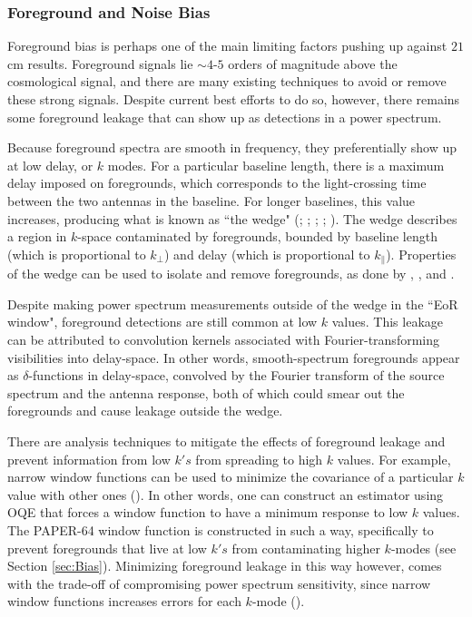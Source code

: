 \documentclass[preprint2,numberedappendix,tighten]{aastex6}  %
\begin{document}
\subsubsection{Foreground and Noise Bias}
\label{sec:BiasTypes}

Foreground bias is perhaps one of the main limiting factors pushing up against $21$ cm results. Foreground signals lie $\sim4$-$5$ orders of magnitude above the cosmological signal, and there are many existing techniques to avoid or remove these strong signals. Despite current best efforts to do so, however, there remains some foreground leakage that can show up as detections in a power spectrum. 

Because foreground spectra are smooth in frequency, they preferentially show up at low delay, or $k$ modes. For a particular baseline length, there is a maximum delay imposed on foregrounds, which corresponds to the light-crossing time between the two antennas in the baseline. For longer baselines, this value increases, producing what is known as ``the wedge" (\citealt{parsons_et_al2012b}; \citealt{liu_et_al2014a}; \citealt{liu_et_al2014b}; \citealt{vedantham_et_al2012}; \citealt{thyagarajan_et_al2013}). The wedge describes a region in $k$-space contaminated by foregrounds, bounded by baseline length (which is proportional to $k_{\perp}$) and delay (which is proportional to $k_{\parallel}$). Properties of the wedge can be used to isolate and remove foregrounds, as done by \citet{ali_et_al2015}, \citet{parsons_et_al2014}, and \citet{jacobs_et_al2015}.

Despite making power spectrum measurements outside of the wedge in the ``EoR window", foreground detections are still common at low $k$ values. This leakage can be attributed to convolution kernels associated with Fourier-transforming visibilities into delay-space. In other words, smooth-spectrum foregrounds appear as $\delta$-functions in delay-space, convolved by the Fourier transform of the source spectrum and the antenna response, both of which could smear out the foregrounds and cause leakage outside the wedge.

There are analysis techniques to mitigate the effects of foreground leakage and prevent information from low $k's$ from spreading to high $k$ values. For example, narrow window functions can be used to minimize the covariance of a particular $k$ value with other ones (\citealt{liu_et_al2014b}). In other words, one can construct an estimator using OQE that forces a window function to have a minimum response to low $k$ values. The PAPER-64 window function is constructed in such a way, specifically to prevent foregrounds that live at low $k's$ from contaminating higher $k$-modes (see Section \ref{sec:Bias}). Minimizing foreground leakage in this way however, comes with the trade-off of compromising power spectrum sensitivity, since narrow window functions increases errors for each $k$-mode (\citealt{liu_et_al2014b}). 
\end{document}
